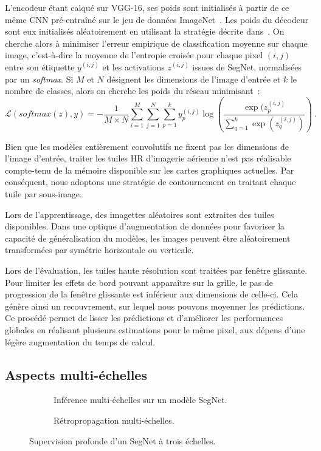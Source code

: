 L'encodeur étant calqué sur VGG-16, ses poids sont initialisés à partir de ce même CNN pré-entraîné sur le jeu de données ImageNet~\cite{deng_imagenet_2009}. Les poids du décodeur sont eux initialisés aléatoirement en utilisant la stratégie décrite dans~\cite{he_delving_2015}. On cherche alors à minimiser l'erreur empirique de classification moyenne sur chaque image, c'est-à-dire la moyenne de l'entropie croisée pour chaque pixel $(i,j)$ entre son étiquette $y^{(i,j)}$ et les activations $z^{(i,j)}$ issues de SegNet, normalisées par un \emph{softmax}. Si $M$ et $N$ désignent les dimensions de l'image d'entrée et $k$ le nombre de classes, alors on cherche les poids du réseau minimisant~:
\begin{equation}
\mathcal{L}(\mathit{softmax}(z),y) = - \frac{1}{M \times N} \sum_{i=1}^M \sum_{j=1}^N \sum_{p=1}^k y_p^{(i,j)} \log\left(\frac{\exp(z_p^{(i,j)}}{\sum\limits_{q=1}^k \exp(z_q^{(i,j)})}\right)~.
\end{equation}


Bien que les modèles entièrement convolutifs ne fixent pas les dimensions de l'image d'entrée, traiter les tuiles \gls{HR} d'imagerie aérienne n'est pas réalisable compte-tenu de la mémoire disponible sur les cartes graphiques actuelles. Par conséquent, nous adoptons une stratégie de contournement en traitant chaque tuile par sous-image.

Lors de l'apprentissage, des imagettes aléatoires sont extraites des tuiles disponibles. Dans une optique d'augmentation de données pour favoriser la capacité de généralisation du modèles, les images peuvent être aléatoirement transformées par symétrie horizontale ou verticale.

Lors de l'évaluation, les tuiles haute résolution sont traitées par fenêtre glissante. Pour limiter les effets de bord pouvant apparaître sur la grille, le pas de progression de la fenêtre glissante est inférieur aux dimensions de celle-ci. Cela génère ainsi un recouvrement, sur lequel nous pouvons moyenner les prédictions. Ce procédé permet de lisser les prédictions et d'améliorer les performances globales en réalisant plusieurs estimations pour le même pixel, aux dépens d'une légère augmentation du temps de calcul.

\subsection{Aspects multi-échelles}

\begin{figure}
	  \begin{subfigure}[t]{0.50\textwidth}
		\resizebox{\textwidth}{!}{}
        \caption{Inférence multi-échelles sur un modèle SegNet.}
    \end{subfigure}
    \begin{subfigure}[t]{0.50\textwidth}
		\resizebox{\textwidth}{!}{}
        \caption{Rétropropagation multi-échelles.}
    \end{subfigure}
    \caption{Supervision profonde d'un SegNet à trois échelles.}
    \label{fig:ms_deep_segnet}
\end{figure}

